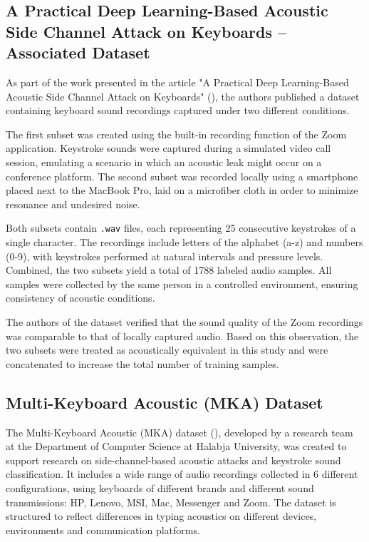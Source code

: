 \documentclass[a4paper,11pt,twoside]{report}
\theoremstyle{definition}
\begin{document}
\subsection{A Practical Deep Learning-Based Acoustic Side Channel Attack on Keyboards – Associated Dataset \protect\footnotemark}
\label{practicatDataset}



As part of the work presented in the article "A Practical Deep Learning-Based Acoustic Side Channel Attack on Keyboards" (\textit{\cite{coatnet2023}}), the authors published a dataset containing keyboard sound recordings captured under two different conditions.

The first subset was created using the built-in recording function of the Zoom application. Keystroke sounds were captured during a simulated video call session, emulating a scenario in which an acoustic leak might occur on a conference platform. The second subset was recorded locally using a smartphone placed next to the MacBook Pro, laid on a microfiber cloth in order to minimize resonance and undesired noise.

Both subsets contain \texttt{.wav} files, each representing 25 consecutive keystrokes of a single character. The recordings include letters of the alphabet (a-z) and numbers (0-9), with keystrokes performed at natural intervals and pressure levels. Combined, the two subsets yield a total of 1788 labeled audio samples. All samples were collected by the same person in a controlled environment, ensuring consistency of acoustic conditions.

The authors of the dataset verified that the sound quality of the Zoom recordings was comparable to that of locally captured audio. Based on this observation, the two subsets were treated as acoustically equivalent in this study and were concatenated to increase the total number of training samples.


\subsection{Multi-Keyboard Acoustic (MKA) Dataset \protect\footnotemark}
\label{mkaDataset}


The Multi-Keyboard Acoustic (MKA) dataset (\textit{\cite{mka_dataset}}), developed by a research team at the Department of Computer Science at Halabja University, was created to support research on side-channel-based acoustic attacks and keystroke sound classification. It includes a wide range of audio recordings collected in 6 different configurations, using keyboards of different brands and different sound transmissions: HP, Lenovo, MSI, Mac, Messenger and Zoom. The dataset is structured to reflect differences in typing acoustics on different devices, environments and communication platforms.
\end{document}
